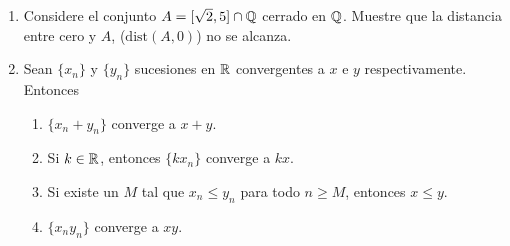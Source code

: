 \begin{enumerate}
    \item Considere el conjunto $A = [\sqrt{2}, 5] \cap \mathbb{Q}$ cerrado en $\mathbb{Q}$. Muestre que la distancia entre cero y $A$, ($\text{dist}(A, 0)$) no se alcanza.
    
    \item Sean $\{x_n\}$ y $\{y_n\}$ sucesiones en $\mathbb{R}$ convergentes a $x$ e $y$ respectivamente. Entonces
    \begin{enumerate}
        \item[a)] $\{x_n + y_n\}$ converge a $x + y$.
        \item[b)] Si $k \in \mathbb{R}$, entonces $\{kx_n\}$ converge a $kx$.
        \item[c)] Si existe un $M$ tal que $x_n \leq y_n$ para todo $n \geq M$, entonces $x \leq y$.
        \item[d)] $\{x_n y_n\}$ converge a $xy$.
    \end{enumerate}
\end{enumerate}